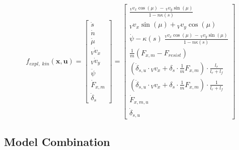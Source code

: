 \documentclass[
a4paper, %
10pt, %
notitlepage,
english]{CSUniSchoolLabReport}
\begin{document}
\begin{equation}
	f_{expl,\;kin}(\mathbf{x}, \mathbf{u}) =
	\left[\begin{array}{c}
		
		\dot{s} \\ 
		
		\dot{n} \\ 
		
		\dot{\mu} \\
		
		{}_V\dot{v}_x \\
		
		{}_V\dot{v}_y \\
		
		\ddot{\psi}\;\;\; \\
		
		\dot{F}_{x,m} \\
		
		\dot{\delta}_s
		
	\end{array}\right] =
	\left[\begin{array}{c}
		
		\frac{{}_V v_x \cos(\mu) \,-\, {}_V v_y \sin(\mu)}{1 - n \kappa(s)} \\
		
		{}_V v_x \sin(\mu) + {}_V v_y \cos(\mu) \\
		
		\dot{\psi} - \kappa(s)\;\frac{{}_V v_x \cos(\mu) \,-\, {}_V v_y \sin(\mu)}{1 - n \kappa(s)} \\
		
		\frac{1}{m}  \left( F_{x, m} - F_{resist} \right)\\
		
		\left( \dot{\delta}_{s,u} \cdot {}_Vv_x + \delta_s \cdot \frac{1}{m} F_{x, m}  \right) \cdot  \frac{l_r}{l_r+l_f}\\
		
		\left( \dot{\delta}_{s,u} \cdot {}_Vv_x + \delta_s \cdot \frac{1}{m} F_{x, m} \right) \cdot  \frac{1}{l_r+l_f} \\
		
		\dot{F}_{x,m,u} \\
		
		\dot{\delta}_{s,u}
	\end{array}\right]
\end{equation}


\subsection{Model Combination}
\end{document}
